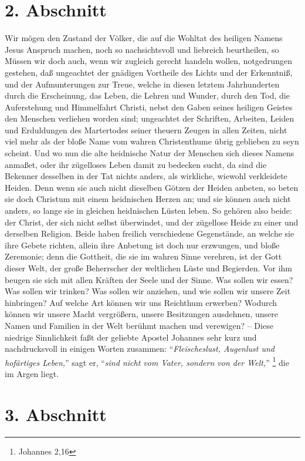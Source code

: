 \section{2. Abschnitt} \label{kap1_ab2}
Wir mögen den Zustand der Völker, die auf die Wohltat des heiligen Namens Jesus
Anspruch machen, noch so nachsichtsvoll und liebreich beurtheilen, so Müssen wir
doch auch, wenn wir zugleich gerecht handeln wollen, notgedrungen gestehen, daß
ungeachtet der gnädigen Vortheile des Lichts und der Erkenntniß, und der
Aufmunterungen zur Treue, welche in diesen letztem Jahrhunderten durch die
Erscheinung, das Leben, die Lehren und Wunder, durch den Tod, die Auferstehung
und Himmelfahrt Christi, nebst den Gaben seines heiligen Geistes den Menschen
verliehen worden sind; ungeachtet der Schriften, Arbeiten, Leiden und
Erduldungen des Martertodes seiner theuern Zeugen in allen Zeiten, nicht viel
mehr als der bloße Name vom wahren Christenthume übrig geblieben zu seyn
scheint. Und wo nun die alte heidnische Natur der Menschen sich dieses Namens
anmaßet, oder ihr zügelloses Leben damit zu bedecken sucht, da sind die Bekenner
desselben in der Tat nichts anders, als wirkliche, wiewohl verkleidete Heiden.
Denn wenn sie auch nicht dieselben Götzen der Heiden anbeten, so beten sie doch
Christum mit einem heidnischen Herzen an; und sie können auch nicht anders, so
lange sie in gleichen heidnischen Lüsten leben. So gehören also beide: der
Christ, der sich nicht selbst überwindet, und der zügellose Heide zu einer und
derselben Religion. Beide haben freilich verschiedene Gegenstände,
an welche sie ihre Gebete richten, allein ihre Anbetung ist doch nur erzwungen,
und bloße Zeremonie; denn die Gottheit, die sie im wahren Sinne verehren, ist
der Gott dieser Welt, der große Beherrscher der weltlichen Lüste und Begierden.
Vor ihm beugen sie sich mit allen Kräften der Seele und der Sinne. Was sollen
wir essen? Was sollen wir trinken? Was sollen wir anziehen, und wie sollen wir
unsere Zeit hinbringen? Auf welche Art können wir uns Reichthum erwerben?
Wodurch können wir unsere Macht vergrößern, unsere Besitzungen ausdehnen, unsere
Namen und Familien in der Welt berühmt machen und verewigen? -- Diese niedrige
Sinnlichkeit faßt der geliebte Apostel Johannes sehr kurz und nachdrucksvoll in
einigen Worten zusammen: "`\textit{Fleischeslust, Augenlust und hofärtiges
Leben,}"' sagt er, "`\textit{sind nicht vom Vater, sondern von der Welt,}"'
\footnote{Johannes 2,16}  die im Argen liegt.

\section{3. Abschnitt} \label{kap1_ab3}

